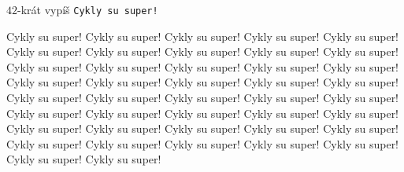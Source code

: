 




$42$-krát vypíš \texttt{Cykly su super!}

\vstup
\vystup
Cykly su super!
Cykly su super!
Cykly su super!
Cykly su super!
Cykly su super!
Cykly su super!
Cykly su super!
Cykly su super!
Cykly su super!
Cykly su super!
Cykly su super!
Cykly su super!
Cykly su super!
Cykly su super!
Cykly su super!
Cykly su super!
Cykly su super!
Cykly su super!
Cykly su super!
Cykly su super!
Cykly su super!
Cykly su super!
Cykly su super!
Cykly su super!
Cykly su super!
Cykly su super!
Cykly su super!
Cykly su super!
Cykly su super!
Cykly su super!
Cykly su super!
Cykly su super!
Cykly su super!
Cykly su super!
Cykly su super!
Cykly su super!
Cykly su super!
Cykly su super!
Cykly su super!
Cykly su super!
Cykly su super!
Cykly su super!
\koniec


